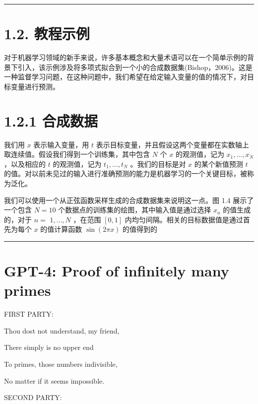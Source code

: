 \documentclass[10pt]{article}
\newcommand{\HRule}{\begin{center}\rule{0.9\linewidth}{0.2mm}\end{center}}
\begin{document}
\HRule

\section*{1.2. 教程示例}

对于机器学习领域的新手来说，许多基本概念和大量术语可以在一个简单示例的背景下引入，该示例涉及将多项式拟合到一个小的合成数据集(Bishop，2006)。这是一种监督学习问题，在这种问题中，我们希望在给定输入变量的值的情况下，对目标变量进行预测。

\section*{1.2.1 合成数据}

我们用 \(x\) 表示输入变量，用 \(t\) 表示目标变量，并且假设这两个变量都在实数轴上取连续值。假设我们得到一个训练集，其中包含 \(N\) 个 \(x\) 的观测值，记为 \({x}_{1},\ldots ,{x}_{N}\) ，以及相应的 \(t\) 的观测值，记为 \({t}_{1},\ldots ,{t}_{N}\) 。我们的目标是对 \(x\) 的某个新值预测 \(t\) 的值。对以前未见过的输入进行准确预测的能力是机器学习的一个关键目标，被称为泛化。

我们可以使用一个从正弦函数采样生成的合成数据集来说明这一点。图 1.4 展示了一个包含 \(N = {10}\) 个数据点的训练集的绘图，其中输入值是通过选择 \({x}_{n}\) 的值生成的，对于 \(n =\)  \(1,\ldots ,N\) ，在范围 \(\left\lbrack  {0,1}\right\rbrack\) 内均匀间隔。相关的目标数据值是通过首先为每个 \(x\) 的值计算函数 \(\sin \left( {2\pi x}\right)\) 的值得到的

\HRule

\section*{GPT-4: Proof of infinitely many primes}

\hspace*{1em} FIRST PARTY:

\hspace*{1em} Thou dost not understand, my friend,

\hspace*{1em} There simply is no upper end

\hspace*{1em} To primes, those numbers indivisible,

\hspace*{1em} No matter if it seems impossible.

\hspace*{1em} SECOND PARTY:
\end{document}
